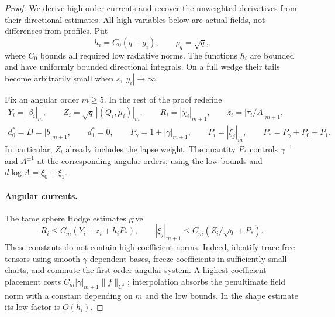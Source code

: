 \begin{proof}
We derive high-order currents and recover the unweighted derivatives
from their directional estimates. All high variables below are actual fields,
not differences from profiles. Put
\[
 h_i=C_0(q+g_i),\qquad \rho_q=\sqrt q,
\]
where $C_0$ bounds all required low radiative norms. The functions
$h_i$ are bounded and have uniformly bounded directional integrals.
On a full wedge their tails become arbitrarily small when
$s,|y_i|\to\infty$.

Fix an angular order $m\ge5$. In the rest of the proof redefine
\begin{equation}\label{in:high-variables}
\begin{gathered}
 Y_i=|\beta_i|_m,\qquad
 Z_i=\sqrt q\,|(Q_i,\mu_i)|_m,\qquad
 R_i=|\chi_i|_{m+1},\qquad z_i=|\tau_i/A|_{m+1},\\
 d_0^*=D=|b|_{m+1},\qquad d_1^*=0,\qquad
 P_\gamma=1+|\gamma|_{m+1},\qquad
 P_i=|\xi_j|_m,\qquad P_*=P_\gamma+P_0+P_1.
\end{gathered}
\end{equation}
In particular, $Z_i$ already includes the lapse weight.
The quantity $P_*$ controls $\gamma^{-1}$ and $A^{\pm1}$ at the
corresponding angular orders, using the low bounds and
$d\log A=\xi_0+\xi_1$.

\paragraph{Angular currents.}
The tame sphere Hodge estimates give
\begin{equation}\label{in:high-hodge}
 R_i\le C_m(Y_i+z_i+h_iP_*),\qquad
 |\xi_j|_{m+1}\le C_m(Z_i/\sqrt q+P_*).
\end{equation}
These constants do not contain high coefficient norms. Indeed,
identify trace-free tensors using smooth $\gamma$-dependent bases,
freeze coefficients in sufficiently small charts, and commute the
first-order angular system. A highest coefficient placement costs
$C_m|\gamma|_{m+1}\|f\|_{C^1}$; interpolation absorbs the
penultimate field norm with a constant depending on $m$ and the low
bounds. In the shape estimate its low factor is $O(h_i)$.


\end{proof}
